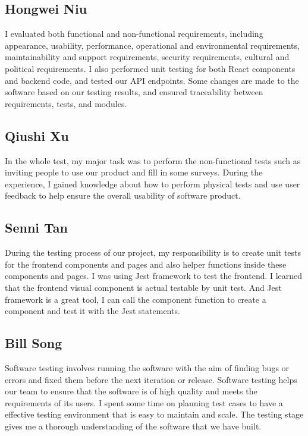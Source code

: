 \documentclass[12pt, titlepage]{article}
\begin{document}
\subsection{Hongwei Niu}
I evaluated both functional and non-functional requirements, including appearance, usability, performance, operational and environmental requirements, maintainability and support requirements, security requirements, cultural and political requirements. I also performed unit testing for both React components and backend code, and tested our API endpoints. Some changes are made to the software based on our testing results, and ensured traceability between requirements, tests, and modules.

\subsection{Qiushi Xu}
In the whole test, my major task was to perform the non-functional tests such as inviting people to use our product and fill in some surveys. During the experience, I gained knowledge about how to perform physical tests and use user feedback to help ensure the overall usability of software product.

\subsection{Senni Tan}
During the testing process of our project, my responsibility is to create unit tests for the frontend components and pages and also helper functions inside these components and pages. I was using Jest framework to test the frontend. I learned that the frontend visual component is actual testable by unit test. And Jest framework is a great tool, I can call the component function to create a component and test it with the Jest statements. 

\subsection{Bill Song}
Software testing involves running the software with the aim of finding bugs or errors and fixed them before the next iteration or release. Software testing helps our team to ensure that the software is of high quality and meets the requirements of its users. I spent some time on planning test cases to have a effective testing environment that is easy to maintain and scale. The testing stage gives me a thorough understanding of the software that we have built.
\end{document}
